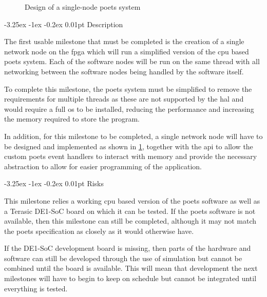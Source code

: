 \documentclass[paper=a4, fontsize=11pt, bibliography=totocnumbered]{scrartcl}
\makeatletter
\renewcommand\paragraph{\@startsection{paragraph}{4}{\z@}%
  {-3.25ex \@plus -1ex \@minus -0.2ex}%
  {0.01pt}%
  {\raggedsection\normalfont\sectfont\nobreak\size@paragraph}%
}
\numberwithin{equation}{section}		%
\numberwithin{figure}{section}			%
\numberwithin{table}{section}				%
\makeatother
\begin{document}
\begin{figure}[h]
\centering
{}
\caption{Design of a single-node \gls{poets} system}
\label{fig:single_node}
\end{figure}

\paragraph{Description}

The first usable milestone that must be completed is the creation of a single \gls{network node} on the \gls{fpga} which will run a simplified version of the \gls{cpu} based \gls{poets} system. Each of the \glspl{software node} will be run on the same \gls{thread} with all networking between the \glspl{software node} being handled by the software itself.

To complete this milestone, the \gls{poets} system must be simplified to remove the requirements for multiple \glspl{thread} as these are not supported by the \gls{hal}\cite{wiki:hal} and would require a full \gls{os} to be installed, reducing the performance and increasing the memory required to store the program.

In addition, for this milestone to be completed, a single \gls{network node} will have to be designed and implemented as shown in \cref{fig:single_node}, together with the \gls{api} to allow the custom \gls{poets} event handlers to interact with memory and provide the necessary abstraction to allow for easier programming of the \gls{application}. 

\paragraph{Risks}

This milestone relies a working \gls{cpu} based version of the \gls{poets} software as well as a Terasic DE1-SoC board on which it can be tested. If the \gls{poets} software is not available, then this milestone can still be completed, although it may not match the \gls{poets} specification as closely as it would otherwise have.

If the DE1-SoC development board is missing, then parts of the hardware and software can still be developed through the use of simulation but cannot be combined until the board is available. This will mean that development the next milestones will have to begin to keep on schedule but cannot be integrated until everything is tested.
\end{document}
